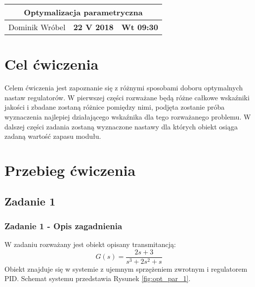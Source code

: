 \documentclass[a4paper,11pt]{article}
\begin{document}
\begin{table}
\begin{center}
\begin{tabular}{|l|l|l|}
\hline
\multicolumn{3}{|c|}{\textbf{Optymalizacja parametryczna}} \\ \hline Dominik Wróbel & \textbf{ 22 V 2018} & \textbf{Wt 09:30} \\ \hline

\end{tabular}
\end{center}
\end{table}
\tableofcontents
\section{Cel ćwiczenia}
Celem ćwiczenia jest zapoznanie się z różnymi sposobami doboru optymalnych nastaw regulatorów. W pierwszej części rozważane będą różne całkowe wskaźniki jakości i zbadane zostaną różnice pomiędzy nimi, podjęta zostanie próba wyznaczenia najlepiej działającego wskaźnika dla tego rozważanego problemu. W dalszej części zadania zostaną wyznaczone nastawy dla których obiekt osiąga zadaną wartość zapasu modułu. 
\section{Przebieg ćwiczenia}
\subsection{Zadanie 1}
\subsubsection{Zadanie 1 - Opis zagadnienia}
W zadaniu rozważany jest obiekt opisany transmitancją:
\begin{equation} \label{eq:transfer}
G(s)=\frac{2s+3}{s^{3}+2s^{2}+s}
\end{equation}
Obiekt znajduje się w systemie z ujemnym sprzężeniem zwrotnym i regulatorem PID. Schemat systemu przedstawia Rysunek \ref{fig:opt_par_1}.
\end{document}
